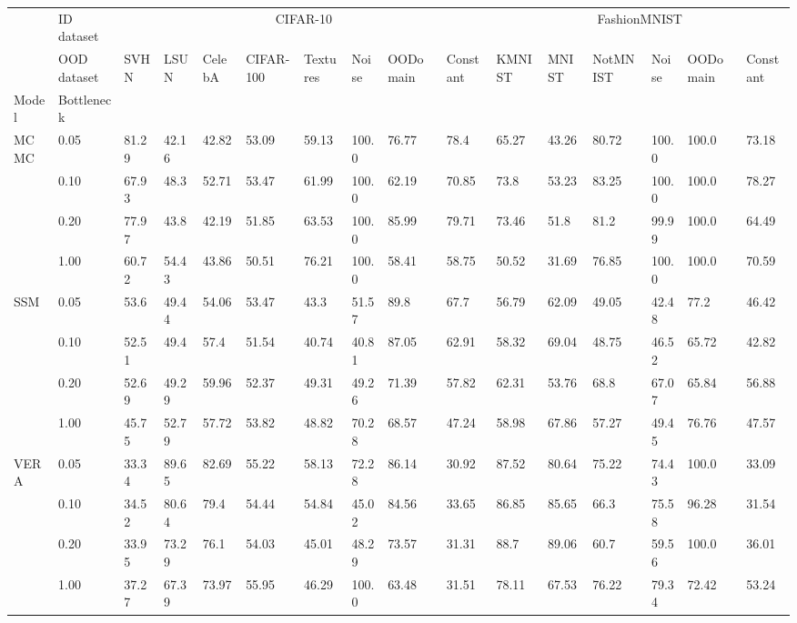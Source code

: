 \begin{tabular}{llllllllllllllll}
\toprule
     & ID dataset & \multicolumn{8}{c}{CIFAR-10} & \multicolumn{6}{c}{FashionMNIST} \\
\cmidrule(l){3-10} \cmidrule(l){11-16} 
     & OOD dataset &     SVHN &   LSUN & CelebA & CIFAR-100 & Textures &  Noise & OODomain & Constant &       KMNIST &  MNIST & NotMNIST &  Noise & OODomain & Constant \\
Model & Bottleneck &          &        &        &           &          &        &          &          &              &        &          &        &          &          \\
\midrule
\multirow{4}{*}{MCMC} & 0.05 &    81.29 &  42.16 &  42.82 &     53.09 &    59.13 &  100.0 &    76.77 &     78.4 &        65.27 &  43.26 &    80.72 &  100.0 &    100.0 &    73.18 \\
     & 0.10 &    67.93 &   48.3 &  52.71 &     53.47 &    61.99 &  100.0 &    62.19 &    70.85 &         73.8 &  53.23 &    83.25 &  100.0 &    100.0 &    78.27 \\
     & 0.20 &    77.97 &   43.8 &  42.19 &     51.85 &    63.53 &  100.0 &    85.99 &    79.71 &        73.46 &   51.8 &     81.2 &  99.99 &    100.0 &    64.49 \\
     & 1.00 &    60.72 &  54.43 &  43.86 &     50.51 &    76.21 &  100.0 &    58.41 &    58.75 &        50.52 &  31.69 &    76.85 &  100.0 &    100.0 &    70.59 \\
\cline{1-16}
\multirow{4}{*}{SSM} & 0.05 &     53.6 &  49.44 &  54.06 &     53.47 &     43.3 &  51.57 &     89.8 &     67.7 &        56.79 &  62.09 &    49.05 &  42.48 &     77.2 &    46.42 \\
     & 0.10 &    52.51 &   49.4 &   57.4 &     51.54 &    40.74 &  40.81 &    87.05 &    62.91 &        58.32 &  69.04 &    48.75 &  46.52 &    65.72 &    42.82 \\
     & 0.20 &    52.69 &  49.29 &  59.96 &     52.37 &    49.31 &  49.26 &    71.39 &    57.82 &        62.31 &  53.76 &     68.8 &  67.07 &    65.84 &    56.88 \\
     & 1.00 &    45.75 &  52.79 &  57.72 &     53.82 &    48.82 &  70.28 &    68.57 &    47.24 &        58.98 &  67.86 &    57.27 &  49.45 &    76.76 &    47.57 \\
\cline{1-16}
\multirow{4}{*}{VERA} & 0.05 &    33.34 &  89.65 &  82.69 &     55.22 &    58.13 &  72.28 &    86.14 &    30.92 &        87.52 &  80.64 &    75.22 &  74.43 &    100.0 &    33.09 \\
     & 0.10 &    34.52 &  80.64 &   79.4 &     54.44 &    54.84 &  45.02 &    84.56 &    33.65 &        86.85 &  85.65 &     66.3 &  75.58 &    96.28 &    31.54 \\
     & 0.20 &    33.95 &  73.29 &   76.1 &     54.03 &    45.01 &  48.29 &    73.57 &    31.31 &         88.7 &  89.06 &     60.7 &  59.56 &    100.0 &    36.01 \\
     & 1.00 &    37.27 &  67.39 &  73.97 &     55.95 &    46.29 &  100.0 &    63.48 &    31.51 &        78.11 &  67.53 &    76.22 &  79.34 &    72.42 &    53.24 \\
\bottomrule
\end{tabular}